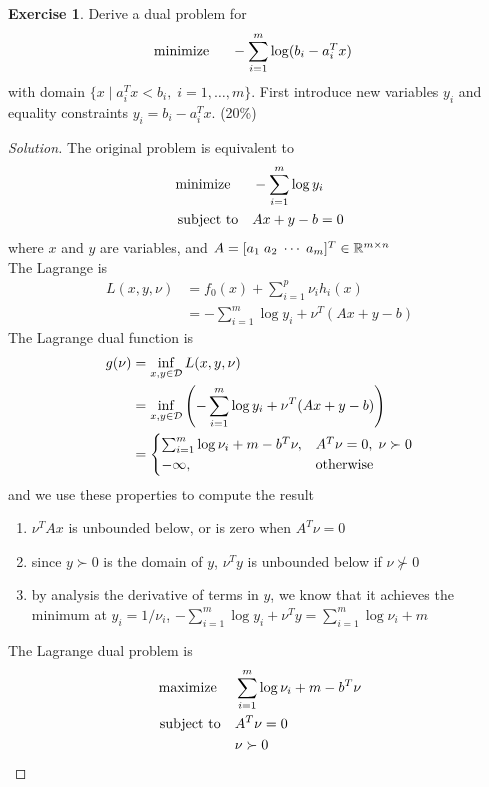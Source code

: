 \documentclass[12pt]{extarticle}
\theoremstyle{definition}
\newtheorem{exercise}{Exercise}
\begin{document}
\begin{exercise}
  Derive a dual problem for
  \begin{align*}
    \text{minimize\;\;}\quad& -\sum_{i=1}^m\log(b_i-a_i^Tx)
  \end{align*}
  with domain $\{x\mid a_i^Tx<b_i,\;i=1,\dots,m\}$.
  First introduce new variables $y_i$ and equality constraints $y_i=b_i-a_i^Tx$. (20\%)
\end{exercise}
\begin{proof}[Solution]
  \let\qed\relax
  The original problem is equivalent to
  \begin{align*}
    \text{minimize\;\;}\quad& -\sum_{i=1}^m\log y_i\\
    \text{subject to}  \quad& Ax+y-b=0
  \end{align*}
  where $x$ and $y$ are variables, and $A=[a_1\;a_2\;\cdots\;a_m]^T\in\mathbb{R}^{m\times n}$\\
  The Lagrange is
  \begin{align*}
    L(x,y,\nu)&=f_0(x)+\sum_{i=1}^p\nu_ih_i(x)\\
              &=-\sum_{i=1}^m\log y_i+\nu^T(Ax+y-b)
  \end{align*}
  The Lagrange dual function is
  \begin{align*}
    g(\nu)&=\inf_{x,y\in\mathcal{D}}L(x,y,\nu)\\
          &=\inf_{x,y\in\mathcal{D}}\left(-\sum_{i=1}^m\log y_i+\nu^T(Ax+y-b)\right)\\
          &=
      \begin{cases}
        \sum_{i=1}^m\log \nu_i+m-b^T\nu,&A^T\nu=0,\;\nu\succ 0\\
        -\infty,&\text{otherwise}
      \end{cases}
  \end{align*}
  and we use these properties to compute the result
  \begin{enumerate}[label=(\roman*)]
    \item $\nu^TAx$ is unbounded below, or is zero when $A^T\nu=0$
    \item since $y\succ 0$ is the domain of $y$, $\nu^Ty$ is unbounded below if $\nu\nsucc 0$
    \item by analysis the derivative of terms in $y$, we know that it achieves the minimum at $y_i=1/\nu_i$, \ie $-\sum_{i=1}^m\log y_i+\nu^Ty=\sum_{i=1}^m\log \nu_i+m$
  \end{enumerate}
  The Lagrange dual problem is
  \begin{align*}
    \text{maximize\;}\quad& \sum_{i=1}^m\log \nu_i+m-b^T\nu\\
    \text{subject to}\quad& A^T\nu=0\\
                          & \nu\succ 0
  \end{align*}
\end{proof}
\end{document}
